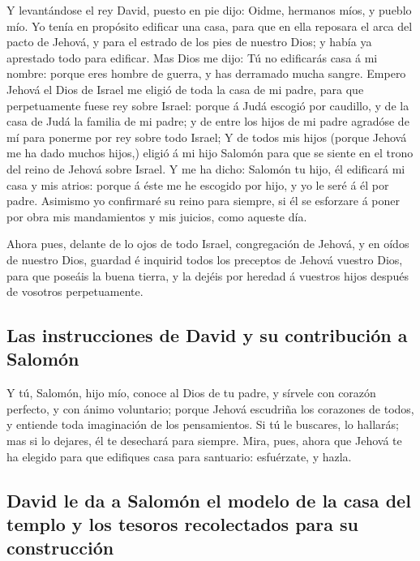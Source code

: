  Y levantándose el rey David, puesto en pie dijo: Oidme,
hermanos míos, y pueblo mío. Yo tenía en propósito edificar una casa,
para que en ella reposara el arca del pacto de Jehová, y para el estrado
de los pies de nuestro Dios; y había ya aprestado todo para edificar.
 Mas Dios me dijo: Tú no edificarás casa á mi nombre:
porque eres hombre de guerra, y has derramado mucha sangre.
 Empero Jehová el Dios de Israel me eligió de toda la casa
de mi padre, para que perpetuamente fuese rey sobre Israel: porque á
Judá escogió por caudillo, y de la casa de Judá la familia de mi padre;
y de entre los hijos de mi padre agradóse de mí para ponerme por rey
sobre todo Israel;  Y de todos mis hijos (porque Jehová me
ha dado muchos hijos,) eligió á mi hijo Salomón para que se siente en el
trono del reino de Jehová sobre Israel.  Y me ha dicho:
Salomón tu hijo, él edificará mi casa y mis atrios: porque á éste me he
escogido por hijo, y yo le seré á él por padre.  Asimismo
yo confirmaré su reino para siempre, si él se esforzare á poner por obra
mis mandamientos y mis juicios, como aqueste día.

 Ahora pues, delante de lo ojos de todo Israel,
congregación de Jehová, y en oídos de nuestro Dios, guardad é inquirid
todos los preceptos de Jehová vuestro Dios, para que poseáis la buena
tierra, y la dejéis por heredad á vuestros hijos después de vosotros
perpetuamente.

\hypertarget{las-instrucciones-de-david-y-su-contribuciuxf3n-a-salomuxf3n}{%
\subsection{Las instrucciones de David y su contribución a
Salomón}\label{las-instrucciones-de-david-y-su-contribuciuxf3n-a-salomuxf3n}}

 Y tú, Salomón, hijo mío, conoce al Dios de tu padre, y
sírvele con corazón perfecto, y con ánimo voluntario; porque Jehová
escudriña los corazones de todos, y entiende toda imaginación de los
pensamientos. Si tú le buscares, lo hallarás; mas si lo dejares, él te
desechará para siempre.  Mira, pues, ahora que Jehová te
ha elegido para que edifiques casa para santuario: esfuérzate, y hazla.

\hypertarget{david-le-da-a-salomuxf3n-el-modelo-de-la-casa-del-templo-y-los-tesoros-recolectados-para-su-construcciuxf3n}{%
\subsection{David le da a Salomón el modelo de la casa del templo y los
tesoros recolectados para su
construcción}\label{david-le-da-a-salomuxf3n-el-modelo-de-la-casa-del-templo-y-los-tesoros-recolectados-para-su-construcciuxf3n}}

